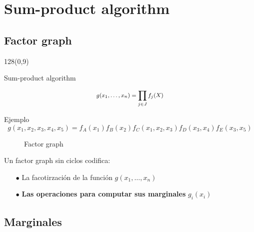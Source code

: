 \documentclass[shownotes]{beamer}
\begin{document}
\section{Sum-product algorithm}

\subsection{Factor graph}

\begin{frame}
 
\begin{textblock}{128}(0,9)
\begin{center}
 \large Sum-product algorithm
\end{center}
\end{textblock}
\vspace{1cm}

\begin{equation*}
\footnotesize
\begin{split} 
g(x_1,\dots,x_n) = \prod_{j \in J} f_j(X) 
\end{split}
\end{equation*}

Ejemplo
\begin{equation*}
g(x_1,x_2,x_3,x_4,x_5) = f_A(x_1)f_B(x_2)f_C(x_1,x_2,x_3)f_D(x_3,x_4)f_E(x_3,x_5)
\end{equation*}
\vspace{-0.5cm}
\begin{figure}[H]
\centering
  \caption*{\scriptsize Factor graph}
  \vspace{-0.1cm}
  \scalebox{.74}{}
\end{figure}

\pause


\begin{framed}
Un factor graph sin ciclos codifica:
\begin{itemize}
 \item[$\bullet$] La facotirzaci\'on de la funci\'on $g(x_1,\dots,x_n)$
 \item[$\bullet$] \textbf{Las operaciones para computar sus marginales} $g_i(x_i)$
\end{itemize} 
\end{framed}

 
\end{frame}

\subsection{Marginales}
\end{document}
